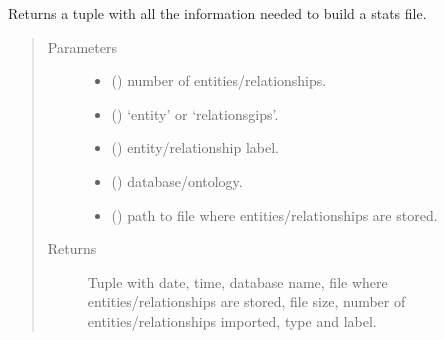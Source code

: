 \documentclass[letterpaper,10pt,english]{sphinxmanual}
\begin{document}

\begin{fulllineitems}
\label{\detokenize{_autosummary/graphdb_builder:graphdb_builder.builder_utils.buildStats}}
Returns a tuple with all the information needed to build a stats file.
\begin{quote}\begin{description}
\item[{Parameters}] \leavevmode\begin{itemize}
\item {} 
 () \textendash{} number of entities/relationships.

\item {} 
 () \textendash{} ‘entity’ or ‘relationsgips’.

\item {} 
 () \textendash{} entity/relationship label.

\item {} 
 () \textendash{} database/ontology.

\item {} 
 () \textendash{} path to file where entities/relationships are stored.

\end{itemize}

\item[{Returns}] \leavevmode
Tuple with date, time, database name, file where entities/relationships are stored,     file size, number of entities/relationships imported, type and label.

\end{description}\end{quote}

\end{fulllineitems}
\end{document}
